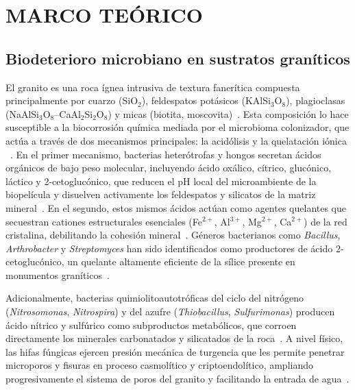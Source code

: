 
\chapter{MARCO TEÓRICO}
\label{chap:marco_teorico}

\section{Biodeterioro microbiano en sustratos graníticos}
\label{sec:biodeterioro}

El granito es una roca ígnea intrusiva de textura fanerítica compuesta
principalmente por cuarzo (SiO$_2$), feldespatos potásicos (KAlSi$_3$O$_8$),
plagioclasas (NaAlSi$_3$O$_8$--CaAl$_2$Si$_2$O$_8$) y micas (biotita,
moscovita)~\cite{mnaahp2015}. Esta composición lo hace susceptible a la
biocorrosión química mediada por el microbioma colonizador, que actúa
a través de dos mecanismos principales: la acidólisis y la
quelatación iónica ~\cite{dakal2012, yadav2025}. En el primer
mecanismo, bacterias heterótrofas y hongos secretan ácidos orgánicos de
bajo peso molecular, incluyendo ácido oxálico, cítrico, glucónico,
láctico y 2-cetoglucónico, que reducen el pH local del microambiente
de la biopelícula y disuelven activamente los feldespatos y silicatos
de la matriz mineral~\cite{yadav2025, gutarowska2015}. En el segundo, estos
mismos ácidos actúan como agentes quelantes que secuestran cationes
estructurales esenciales (Fe$^{2+}$, Al$^{3+}$, Mg$^{2+}$, Ca$^{2+}$) de
la red cristalina, debilitando la cohesión mineral~\cite{yadav2025}.
Géneros bacterianos como \textit{Bacillus}, \textit{Arthrobacter} y
\textit{Streptomyces} han sido identificados como productores de ácido
2-cetoglucónico, un quelante altamente eficiente de la sílice presente
en monumentos graníticos~\cite{gutarowska2015}.

Adicionalmente, bacterias quimiolitoautotróficas del ciclo del nitrógeno
(\textit{Nitrosomonas}, \textit{Nitrospira}) y del azufre
(\textit{Thiobacillus}, \textit{Sulfurimonas}) producen ácido nítrico y
sulfúrico como subproductos metabólicos, que corroen directamente los
minerales carbonatados y silicatados de la roca~\cite{dakal2012,
suchy2024,ding2020}. A nivel físico, las hifas fúngicas ejercen presión mecánica
de turgencia que les permite penetrar microporos y
fisuras en proceso casmolítico y criptoendolítico, ampliando
progresivamente el sistema de poros del granito y facilitando la
entrada de agua~\cite{yadav2025, gorbushina2007}.


